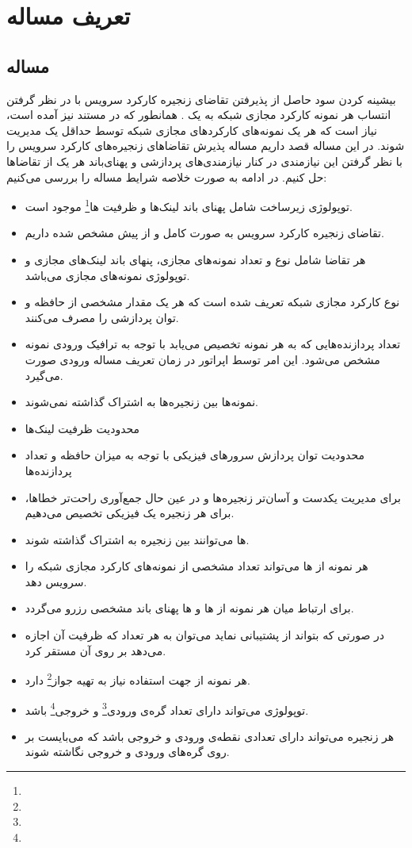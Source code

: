 \chapter{تعریف مساله}

\section{مساله}
بیشینه کردن سود حاصل از پذیرفتن تقاضای زنجیره‌ کارکرد سرویس با در نظر گرفتن انتساب هر نمونه کارکرد مجازی شبکه به یک .
همانطور که در مستند \cite{ETSI-MAN} نیز آمده است، نیاز است که هر یک نمونه‌های کارکردهای مجازی شبکه
توسط حداقل یک  مدیریت شوند.
در این مساله قصد داریم مساله پذیرش تقاضاهای زنجیره‌های کارکرد سرویس را با نظر گرفتن این نیازمندی در کنار
نیازمندی‌های پردازشی و پهنای‌باند هر یک از تقاضاها حل کنیم.
در ادامه به صورت خلاصه شرایط مساله را بررسی می‌کنیم:

\begin{itemize}
    \item توپولوژی زیرساخت شامل پهنای باند لینک‌ها و ظرفیت ها\footnote{} موجود است.
    \item {} تقاضای زنجیره‌ کارکرد سرویس به صورت کامل و از پیش مشخص شده داریم.
    \item هر تقاضا شامل نوع و تعداد نمونه‌های مجازی، پنهای باند لینک‌های مجازی و توپولوژی نمونه‌های مجازی می‌باشد.
    \item {} نوع کارکرد مجازی شبکه تعریف شده است که هر یک مقدار مشخصی از حافظه و توان پردازشی را مصرف می‌کنند.
    \item تعداد پردازنده‌هایی که به هر نمونه تخصیص می‌یابد با توجه به ترافیک ورودی نمونه مشخص می‌شود. این امر توسط اپراتور در زمان تعریف مساله ورودی صورت می‌گیرد.
    \item نمونه‌ها بین زنجیره‌ها به اشتراک گذاشته نمی‌شوند.
    \item محدودیت ظرفیت لینک‌ها
    \item محدودیت توان پردازش سرورهای فیزیکی با توجه به میزان حافظه و تعداد پردازنده‌ها
    \item برای مدیریت یکدست و آسان‌تر زنجیره‌ها و در عین حال جمع‌آوری راحت‌تر خطاها، برای هر زنجیره یک  فیزیکی تخصیص می‌دهیم.
    \item {}ها می‌توانند بین زنجیره به اشتراک گذاشته شوند.
    \item هر نمونه از ها می‌تواند تعداد مشخصی از نمونه‌های کارکرد مجازی شبکه را سرویس دهد. 
    \item برای ارتباط میان هر نمونه از ها و ها پهنای باند مشخصی رزرو می‌گردد.
    \item در صورتی که  بتواند از  پشتیبانی نماید می‌توان به هر تعداد که ظرفیت آن اجازه می‌دهد بر روی آن  مستقر کرد.
    \item هر نمونه از  جهت استفاده نیاز به تهیه جواز\footnote{} دارد.
    \item توپولوژی می‌تواند دارای تعداد گره‌ی ورودی\footnote{} و خروجی\footnote{} باشد.
    \item هر زنجیره می‌تواند دارای تعدادی نقطه‌ی ورودی و خروجی باشد که می‌بایست بر روی گره‌های ورودی و خروجی نگاشته شوند.
\end{itemize}

